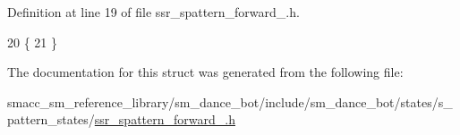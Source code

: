 Definition at line 19 of file ssr\+\_\+spattern\+\_\+forward\+\_.\+h.


\begin{DoxyCode}
20   \{
21   \}
\end{DoxyCode}


The documentation for this struct was generated from the following file\+:\begin{DoxyCompactItemize}
\item 
smacc\+\_\+sm\+\_\+reference\+\_\+library/sm\+\_\+dance\+\_\+bot/include/sm\+\_\+dance\+\_\+bot/states/s\+\_\+pattern\+\_\+states/\hyperlink{ssr__spattern__forward__3_8h}{ssr\+\_\+spattern\+\_\+forward\+\_.\+h}\end{DoxyCompactItemize}
